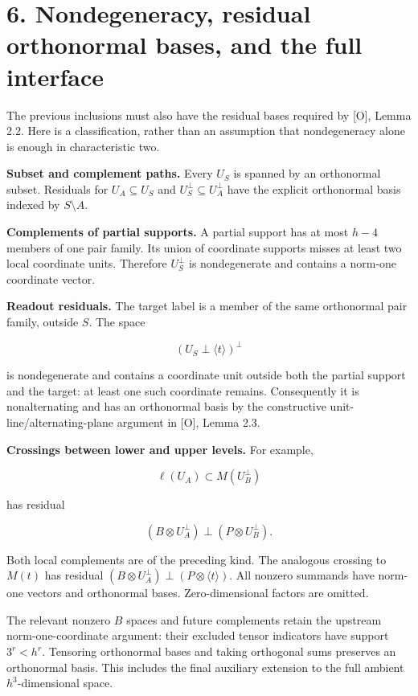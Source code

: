\documentclass[
  11pt,
  letterpaper,
]{article}
\begin{document}
\section{6. Nondegeneracy, residual orthonormal bases, and the full
interface}\label{nondegeneracy-residual-orthonormal-bases-and-the-full-interface}

The previous inclusions must also have the residual bases required by
{[}O{]}, Lemma 2.2. Here is a classification, rather than an assumption
that nondegeneracy alone is enough in characteristic two.

\textbf{Subset and complement paths.} Every \(U_S\) is spanned by an
orthonormal subset. Residuals for \(U_A\subseteq U_S\) and
\(U_S^\perp\subseteq U_A^\perp\) have the explicit orthonormal basis
indexed by \(S\setminus A\).

\textbf{Complements of partial supports.} A partial support has at most
\(h-4\) members of one pair family. Its union of coordinate supports
misses at least two local coordinate units. Therefore \(U_S^\perp\) is
nondegenerate and contains a norm-one coordinate vector.

\textbf{Readout residuals.} The target label is a member of the same
orthonormal pair family, outside \(S\). The space

\[
(U_S\perp\langle t\rangle)^\perp
\]

is nondegenerate and contains a coordinate unit outside both the partial
support and the target: at least one such coordinate remains.
Consequently it is nonalternating and has an orthonormal basis by the
constructive unit-line/alternating-plane argument in {[}O{]}, Lemma 2.3.

\textbf{Crossings between lower and upper levels.} For example,

\[
\ell(U_A)\subset M(U_B^\perp)
\]

has residual

\[
(B\otimes U_A^\perp)\perp(P\otimes U_B^\perp).
\]

Both local complements are of the preceding kind. The analogous crossing
to \(M(t)\) has residual
\((B\otimes U_A^\perp)\perp(P\otimes\langle t\rangle)\). All nonzero
summands have norm-one vectors and orthonormal bases. Zero-dimensional
factors are omitted.

The relevant nonzero \(B\) spaces and future complements retain the
upstream norm-one-coordinate argument: their excluded tensor indicators
have support \(3^r<h^r\). Tensoring orthonormal bases and taking
orthogonal sums preserves an orthonormal basis. This includes the final
auxiliary extension to the full ambient \(h^3\)-dimensional space.
\end{document}
